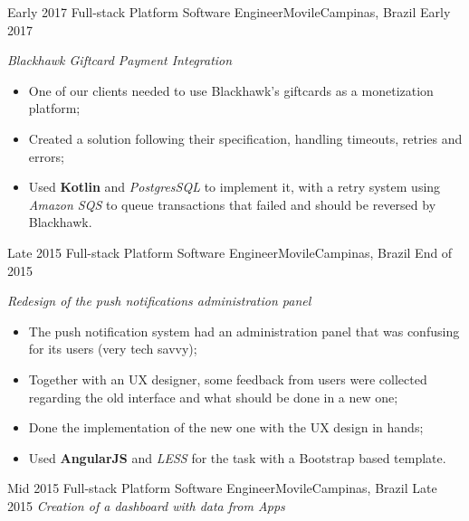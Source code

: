 %
%
%


\begin{experiences}
  \experience
  {Early 2017} {Full-stack Platform Software Engineer}{Movile}{Campinas, Brazil}
  {Early 2017}
        {
        \emph{Blackhawk Giftcard Payment Integration}\\
          \begin{itemize}
            \item One of our clients needed to use Blackhawk's giftcards as a monetization platform;
            \item Created a solution following their specification, handling timeouts, retries and errors;
            \item Used \textbf{Kotlin} and \emph{PostgresSQL} to implement it, with a retry system using \emph{Amazon SQS} to queue transactions that failed and should be reversed by Blackhawk.\\ 
          \end{itemize}
        }{}
  \experience
  {Late 2015} {Full-stack Platform Software Engineer}{Movile}{Campinas, Brazil}
  {End of 2015}
        {
        \emph{Redesign of the push notifications administration panel}\\
          \begin{itemize}
            \item The push notification system had an administration panel that was confusing for its users (very tech savvy);
            \item Together with an UX designer, some feedback from users were collected regarding the old interface and what should be done in a new one;
            \item Done the implementation of the new one with the UX design in hands;
            \item Used \textbf{AngularJS} and \emph{LESS} for the task with a Bootstrap based template.\\ 
          \end{itemize}
        }{}
  \experience
  {Mid 2015} {Full-stack Platform Software Engineer}{Movile}{Campinas, Brazil}
  {Late 2015}
        {
        \emph{Creation of a dashboard with data from Apps}\\
}
\end{experiences}
